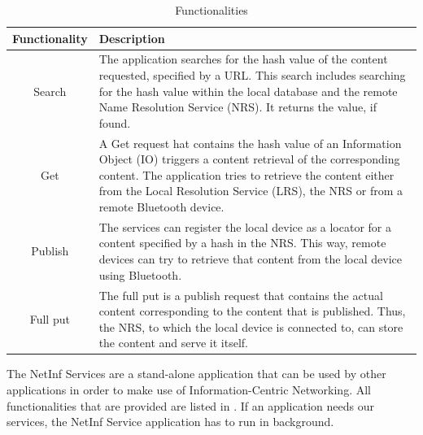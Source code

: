\begin{table}
\centering
 \begin{tabular}{|c|p{10cm}|}\hline
  Functionality	& Description \\\hline
  Search	& The application searches for the hash value of the content requested, specified by a URL. This search includes
		  searching for the hash value within the local database and the remote Name Resolution Service (NRS).
		  It returns the value, if found.\\\hline
  Get		& A Get request hat contains the hash value of an Information Object (IO) triggers a content retrieval of the
		  corresponding content. The application tries to retrieve the content either from the Local Resolution Service (LRS), the NRS
		  or from a remote Bluetooth device.\\\hline
  Publish	& The services can register the local device as a locator for a content specified by a hash in the NRS. This way, remote
		  devices can try to retrieve that content from the local device using Bluetooth. \\\hline
  Full put	& The full put is a publish request that contains the actual content corresponding to the content that is published. Thus,
		  the NRS, to which the local device is connected to, can store the content and serve it itself.\\\hline
		  
 \end{tabular}
  \caption{Functionalities}\label{tab:netinffunctionalities}
\end{table}

The NetInf Services are a stand-alone application that can be used by other
applications in order to make use of Information-Centric Networking. All functionalities
that are provided are listed in . If an application
needs our services, the NetInf Service application has to run in background.

